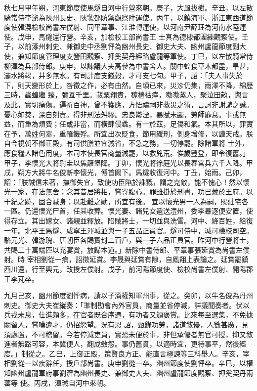 \begin{pinyinscope}
 秋七月甲午朔，河東節度使馬燧自河中行營來朝。庚子，大風拔樹。辛丑，以左散騎常侍李泌為陜州長史、陜虢都防禦觀察陸運使。丙午，以鎮海軍、浙江東西道節度使韓滉檢校尚書左僕射、同平章事、江淮轉運使，以河南尹薛玨為河南水陸運使。戊申，馬燧還行營。辛亥，加檢校工部尚書王
 士真為德棣都團練觀察使。壬子，以前涿州刺史、兼御史中丞劉怦為幽州長史、御史大夫、幽州盧龍節度副大使，兼知節度管理度支營田觀察、押奚契丹經略盧龍等軍使。丁巳，以左散騎常侍柳渾為兵部侍郎。庚申，以諫議大夫高參為中書舍人。關中蝗食草木都盡，旱甚，灞水將竭，井多無水。有司計度支錢穀，才可支七旬。甲子，詔：「夫人事失於下，則天變形於上，咎徵之作，必有由然。自頃已來，災沴仍集，雨澤不降，綿歷三時，蟲蝗繼
 臻，彌亙千里。菽粟翔貴，稼穡枯瘁，嗷嗷蒸人，聚泣田畝，與言及此，實切痛傷。遍祈百神，曾不獲應，方悟禱祠非救災之術，言詞非謝譴之誠。憂心如焚，深自刻責。得非刑法舛繆。忠良鬱湮，暴賦未蠲，勞師靡息。事或無益，而重為煩費；任或非當，而橫肆侵蟊。有一於茲，足傷和氣。本其所以，罪實在予，萬姓何辜，重罹饑殍。所宜出次貶食，節用緩刑，側身增修，以謹天戒。朕自今視朝不御正殿，有司供膳並宜減省，不急之務，一切停罷。除諸軍將
 士外，應食糧人諸色用度，本司本使長官商量減罷，以救兇荒。俟歲豐登，即令復舊。」甲子，李懷光大將尉圭以焦籬堡降。丁卯，懷光將徐庭光以長春宮兵六千人降。甲戌，朔方大將牛名俊斬李懷光，傅首闕下。馬燧收復河中。丁丑，始雨。己卯，詔：「朕誠信未著，撫御失宜，致使功臣陷於誅戮，謂之克敵，能不愧心！然以懷光一家，在法無舍；念其昔居將相，嘗寄腹心。罪雖掛於刑書，功已藏於王府。以干紀之跡，固合滅身；以赴難之勛，所宜有後。
 宜以懷光男一人為嗣，賜莊宅各一區。仍還懷光尸首，任其收葬。懷光妻、諸兒女遞送澧州，委李皋逐便安置，使得存立。其出嫁女、諸親並釋放。陷賊將士，一切並與洗雪。河中、絳百姓，給復一年。北平王馬燧、咸寧王渾瑊並與一子五品正員官。燧可侍中，瑊可檢校司空。駱元光、韓游瑰、唐朝臣各賜實封二百戶，與一子六品正員官。昨河中行營將士，共賜二十萬端匹以充宴賞，放歸本道。」新除中書侍郎、平章事張延賞為尚書左僕射。時
 宰相劉從一病，詔徵延賞。李晟與延賞有隙，自鳳翔上表論之。延賞罷鎮西川還，行至興元，改授左僕射。戊子，前河陽節度使、檢校尚書左僕射、開陽郡王李芃卒。



 九月己亥，幽州節度劉怦病，請以子濟權知軍州事，從之。癸卯，以牛名俊為丹州刺史。御史大夫崔縱奏：「準制勘會內外官員，商量並省停減，詳議聞奏者。伏以兵戎未息，仕進頗多，在官者既合序遷，有功者又頒褒賞。比來每至選集，不免據闕留人，嘗嘆遺才，仍招怨望。況有恩
 詔，甄錄功勞，諸道敘優，人數甚廣，見須處置，不可稽留。今若停減吏員，實恐未便於事，非但承優者無官可授，抑又敘進者無路可容，本冀便人，翻成斂怨。事仍舊貫，以適時宜，更待事平，然後經度。」制從之。乙巳，上御正殿，策賢良方正、能直言極諫等三科舉人。辛亥，宰相劉從一以疾辭任，授戶部尚書。庚申劉從一卒。幽州節度使劉怦卒。辛巳，以權知幽州盧龍軍府事劉濟為幽州長史、兼御史大夫、幽州盧龍節度觀察、押奚契丹兩蕃等
 使。丙戌，渾瑊自河中來朝。




\end{pinyinscope}
